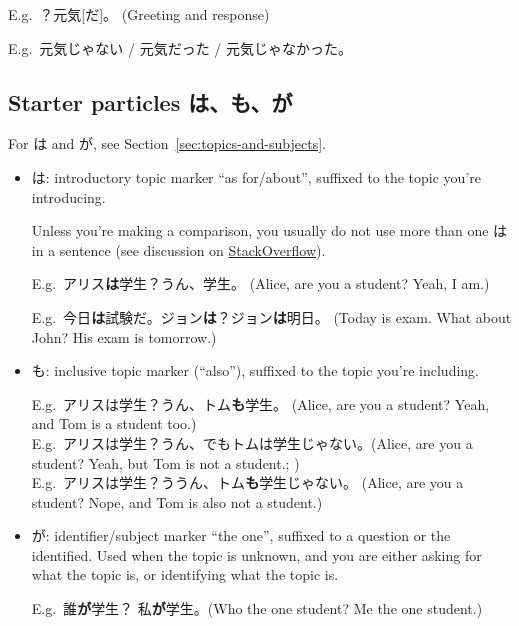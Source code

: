 \documentclass[../nihongo-gakushuu-kyouzai.tex]{subfiles}
\begin{document}
E.g.\ ？元気[だ]。 (Greeting and response)

E.g.\ 元気じゃない / 元気だった / 元気じゃなかった。

\subsection{Starter particles は、も、が} \label{sec:particles}
For は and が, see Section~\ref{sec:topics-and-subjects}.
\begin{itemize}
    \item は: introductory topic marker ``as for/about'', suffixed to the topic you're introducing.

    Unless you're making a comparison, you usually do not use more than one は in a sentence (see discussion on \href{https://japanese.stackexchange.com/q/5375}{StackOverflow}).

    E.g.\ アリス\textbf{は}学生？うん、学生。 (Alice, are you a student? Yeah, I am.)

    E.g.\ 今日\textbf{は}試験だ。ジョン\textbf{は}？ジョン\textbf{は}明日。 (Today is exam. What about John? His exam is tomorrow.)
    \item も: inclusive topic marker (``also''), suffixed to the topic you're including.

    E.g.\ アリスは学生？うん、トム\textbf{も}学生。 (Alice, are you a student? Yeah, and Tom is a student too.) \\
    E.g.\ アリスは学生？うん、でもトムは学生じゃない。(Alice, are you a student? Yeah, but Tom is not a student.; )\\
    E.g.\ アリスは学生？ううん、トム\textbf{も}学生じゃない。 (Alice, are you a student? Nope, and Tom is also not a student.)
    \item が: identifier/subject marker ``the one'', suffixed to a question or the identified. Used when the topic is unknown, and you are either asking for what the topic is, or identifying what the topic is.

    E.g.\ 誰\textbf{が}学生？ 私\textbf{が}学生。(Who the one student? Me the one student.)\\
\end{itemize}
\end{document}
